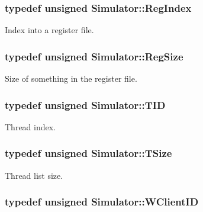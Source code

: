 \hypertarget{namespace_simulator_ab00c9033de4c9a17db7b53d6c292515c}{
\subsubsection[{Reg\+Index}]{\setlength{\rightskip}{0pt plus 5cm}typedef unsigned {\bf Simulator\+::\+Reg\+Index}}}\label{namespace_simulator_ab00c9033de4c9a17db7b53d6c292515c}


Index into a register file. 

\hypertarget{namespace_simulator_a7c5ca3b196c951c92b8159e54e76075f}{
\subsubsection[{Reg\+Size}]{\setlength{\rightskip}{0pt plus 5cm}typedef unsigned {\bf Simulator\+::\+Reg\+Size}}}\label{namespace_simulator_a7c5ca3b196c951c92b8159e54e76075f}


Size of something in the register file. 

\hypertarget{namespace_simulator_a483cc4ecee1736e895054617672cded5}{
\subsubsection[{T\+I\+D}]{\setlength{\rightskip}{0pt plus 5cm}typedef unsigned {\bf Simulator\+::\+T\+I\+D}}}\label{namespace_simulator_a483cc4ecee1736e895054617672cded5}


Thread index. 

\hypertarget{namespace_simulator_aefe00209f3ea9f8e24874de522c3c3e7}{
\subsubsection[{T\+Size}]{\setlength{\rightskip}{0pt plus 5cm}typedef unsigned {\bf Simulator\+::\+T\+Size}}}\label{namespace_simulator_aefe00209f3ea9f8e24874de522c3c3e7}


Thread list size. 

\hypertarget{namespace_simulator_a0de605c35951a450d074222efcef6359}{
\subsubsection[{W\+Client\+I\+D}]{\setlength{\rightskip}{0pt plus 5cm}typedef unsigned {\bf Simulator\+::\+W\+Client\+I\+D}}}\label{namespace_simulator_a0de605c35951a450d074222efcef6359}


